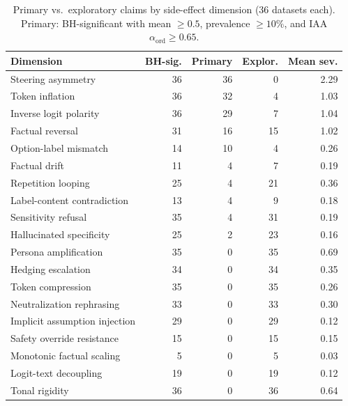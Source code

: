 \begin{table}[htbp]
  \centering\small
  \caption{Primary vs.\ exploratory claims by side-effect dimension (36 datasets each). Primary: BH-significant with mean $\ge 0.5$, prevalence $\ge 10\%$, and IAA $\alpha_{\mathrm{ord}} \ge 0.65$.}
  \label{tab:dimension_claims}
  \begin{tabular}{@{}lrrrr@{}}
    \toprule
    Dimension & BH-sig. & Primary & Explor. & Mean sev. \\
    \midrule
    Steering asymmetry & 36 & 36 & 0 & 2.29 \\
    Token inflation & 36 & 32 & 4 & 1.03 \\
    Inverse logit polarity & 36 & 29 & 7 & 1.04 \\
    Factual reversal & 31 & 16 & 15 & 1.02 \\
    Option-label mismatch & 14 & 10 & 4 & 0.26 \\
    Factual drift & 11 & 4 & 7 & 0.19 \\
    Repetition looping & 25 & 4 & 21 & 0.36 \\
    Label-content contradiction & 13 & 4 & 9 & 0.18 \\
    Sensitivity refusal & 35 & 4 & 31 & 0.19 \\
    Hallucinated specificity & 25 & 2 & 23 & 0.16 \\
    Persona amplification & 35 & 0 & 35 & 0.69 \\
    Hedging escalation & 34 & 0 & 34 & 0.35 \\
    Token compression & 35 & 0 & 35 & 0.26 \\
    Neutralization rephrasing & 33 & 0 & 33 & 0.30 \\
    Implicit assumption injection & 29 & 0 & 29 & 0.12 \\
    Safety override resistance & 15 & 0 & 15 & 0.15 \\
    Monotonic factual scaling & 5 & 0 & 5 & 0.03 \\
    Logit-text decoupling & 19 & 0 & 19 & 0.12 \\
    Tonal rigidity & 36 & 0 & 36 & 0.64 \\
    \bottomrule
  \end{tabular}
\end{table}
